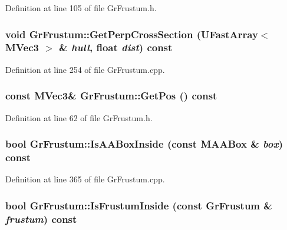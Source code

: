 \begin{CompactItemize}
Definition at line 105 of file GrFrustum.h.\hypertarget{class_gr_frustum_891ca292f3ba613b83c32636716aa337}{
\subsubsection[{GetPerpCrossSection}]{\setlength{\rightskip}{0pt plus 5cm}void GrFrustum::GetPerpCrossSection ({\bf UFastArray}$<$ {\bf MVec3} $>$ \& {\em hull}, \/  float {\em dist}) const}}
\label{class_gr_frustum_891ca292f3ba613b83c32636716aa337}




Definition at line 254 of file GrFrustum.cpp.\hypertarget{class_gr_frustum_77885bad884903f7797f0432ca2ca1fb}{
\subsubsection[{GetPos}]{\setlength{\rightskip}{0pt plus 5cm}const {\bf MVec3}\& GrFrustum::GetPos () const}}
\label{class_gr_frustum_77885bad884903f7797f0432ca2ca1fb}




Definition at line 62 of file GrFrustum.h.\hypertarget{class_gr_frustum_2d3c8e27667405f7d98bcc8bb6e8ece5}{
\subsubsection[{IsAABoxInside}]{\setlength{\rightskip}{0pt plus 5cm}bool GrFrustum::IsAABoxInside (const {\bf MAABox} \& {\em box}) const}}
\label{class_gr_frustum_2d3c8e27667405f7d98bcc8bb6e8ece5}




Definition at line 365 of file GrFrustum.cpp.\hypertarget{class_gr_frustum_40a44d1754e21de45629e9eb5b733cbc}{
\subsubsection[{IsFrustumInside}]{\setlength{\rightskip}{0pt plus 5cm}bool GrFrustum::IsFrustumInside (const {\bf GrFrustum} \& {\em frustum}) const}}
\label{class_gr_frustum_40a44d1754e21de45629e9eb5b733cbc}





\end{CompactItemize}
